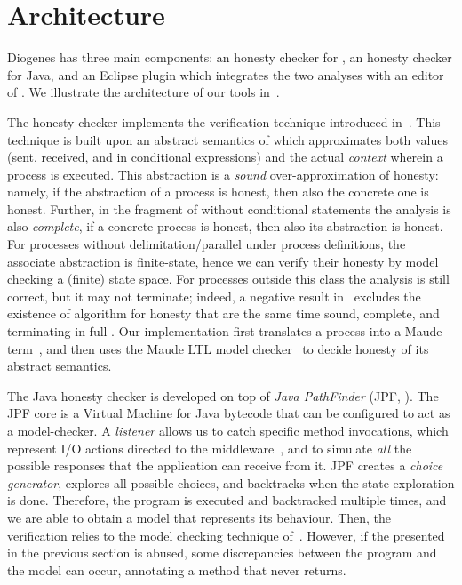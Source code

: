 \section{Architecture}

Diogenes has three main components:
an honesty checker for \coco,
an honesty checker for Java,
and an Eclipse plugin which integrates the two analyses
with an editor of \coco.
We illustrate the architecture of our tools in~.

The \coco honesty checker implements the  
verification technique introduced in~\cite{BMSZ15jlamp}.
This technique is built upon an abstract semantics of \coco 
which approximates both values (sent, received, and in conditional expressions) 
and the actual \emph{context} wherein a process is executed.
This abstraction is a \emph{sound} over-approximation of honesty:
namely, if the abstraction of a process is honest,
then also the concrete one is honest.
Further, in the fragment of \coco without conditional statements
the analysis is also \emph{complete},
\ie if a concrete process is honest, then also its abstraction is honest.
For processes without delimitation/parallel under process definitions,
the associate abstraction is finite-state, 
hence we can verify their honesty by model checking a (finite) state space.
For processes outside this class the analysis is still correct, 
but it may not terminate; indeed, a negative result in~\cite{BZ15wsfm}
excludes the existence of algorithm for honesty that are the same time
sound, complete, and terminating in full \coco.
Our implementation 
first translates a \coco process into a Maude term~\cite{Maude01}, 
and then uses the Maude LTL model checker~\cite{Eker02maude}
to decide honesty of its abstract semantics.


The Java honesty checker is developed on top of \emph{Java PathFinder}
(JPF, \cite{lerda2001addressing,visser2003model}).
The JPF core is a Virtual Machine for Java bytecode
that can be configured to act as a model-checker.
%
A \emph{listener} allows us to catch specific method invocations, 
which represent I/O actions
directed to the middleware~\cite{CO2middleware},
and to simulate \emph{all} the possible responses that 
the application can receive from it.
%
JPF creates a \emph{choice generator}, explores all possible choices,
and backtracks when the state exploration is done.
%
Therefore, the program is executed and backtracked multiple times,
and we are able to obtain a \coco model that represents its behaviour.
Then, the verification relies to the model checking technique of~\cite{BMSZ15jlamp}.
%
However, if the  presented in the previous section
is abused, some discrepancies between the program and the model
can occur, \eg annotating a method that never returns.


